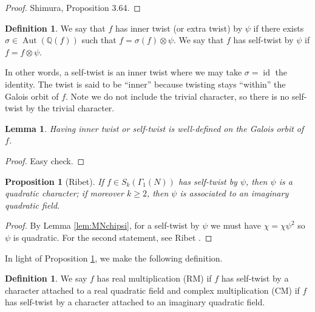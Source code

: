 \documentclass[11pt]{amsart}
\numberwithin{equation}{subsection}
\theoremstyle{plain}
\newtheorem{prop}[equation]{Proposition}
\newtheorem{lem}[equation]{Lemma}
\theoremstyle{definition}
\newtheorem{defn}[equation]{Definition}
\newcommand{\Q}{\mathbb{Q}}
\newcommand{\defi}[1]{\textsf{#1}} 	%
\DeclareMathOperator{\Aut}{Aut}
\DeclareMathOperator{\id}{id}
\begin{document}
\begin{proof}
Shimura, Proposition 3.64.
\end{proof}

\begin{defn}
We say that $f$ has \defi{inner twist} (or \defi{extra twist}) by $\psi$ if there exists $\sigma \in \Aut(\Q(f))$ such that $f=\sigma(f) \otimes \psi$.  We say that $f$ has \defi{self-twist} by $\psi$ if $f=f \otimes \psi$.
\end{defn}

In other words, a self-twist is an inner twist where we may take $\sigma=\id$ the identity.  The twist is said to be ``inner'' because twisting stays ``within'' the Galois orbit of $f$.  Note we do not include the trivial character, so there is no self-twist by the trivial character.  

\begin{lem}
Having inner twist or self-twist is well-defined on the Galois orbit of $f$.
\end{lem}

\begin{proof}
Easy check.
\end{proof}

\begin{prop}[Ribet] \label{prop:ribetcm}
If $f \in S_k(\Gamma_1(N))$ has self-twist by $\psi$, then $\psi$ is a quadratic character; if moreover $k \geq 2$, then $\psi$ is associated to an imaginary quadratic field.
\end{prop}

\begin{proof}
By Lemma \ref{lem:MNchipsi}, for a self-twist by $\psi$ we must have $\chi=\chi\psi^2$ so $\psi$ is quadratic.  For the second statement, see Ribet \cite[Theorem (4.5)]{Ribet:galreps}.
\end{proof}

In light of Proposition \ref{prop:ribetcm}, we make the following definition.

\begin{defn}
We say $f$ has \defi{real multiplication (RM)} if $f$ has self-twist by a character attached to a real quadratic field and \defi{complex multiplication (CM)} if $f$ has self-twist by a character attached to an imaginary quadratic field.
\end{defn}
\end{document}
